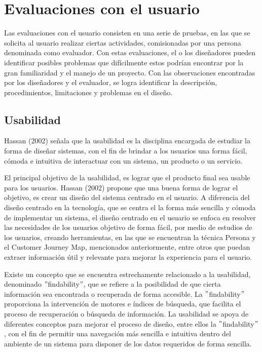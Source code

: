\section{Evaluaciones con el usuario}
\label{EvaluacionesCap3}

Las evaluaciones con el usuario consisten en una serie de pruebas, en las que se solicita al usuario realizar ciertas actividades, comisionadas por una persona denominada como evaluador. Con estas evaluaciones, el o los diseñadores pueden identificar posibles problemas que difícilmente estos podrían encontrar por la gran familiaridad y el manejo de un proyecto. Con las observaciones encontradas por los diseñadores y el evaluador, se logra identificar la descripción, procedimientos, limitaciones y problemas en el diseño.


\subsection{Usabilidad}
\label{UsabilidadCap3}

Hassan (2002) señala que la usabilidad es la disciplina encargada de estudiar la forma de diseñar sistemas, con el fin de brindar a los usuarios una forma fácil, cómoda e intuitiva de interactuar con un sistema, un producto o un servicio.

El principal objetivo de la usabilidad, es lograr que el producto final sea usable para los usuarios. Hassan (2002) propone que una buena forma de lograr el objetivo, es crear un diseño del sistema centrado en el usuario. A diferencia del diseño centrado en la tecnología, que se centra el la forma más sencilla y cómoda de implementar un sistema, el diseño centrado en el usuario se enfoca en resolver las necesidades de los usuarios objetivo de forma fácil, por medio de estudios de los usuarios, creando herramientas, en las que se encuentran la técnica Persona y el Customer Journey Map, mencionados anteriormente, entre otros que puedan extraer información útil y relevante para mejorar la experiencia para el usuario.

Existe un concepto que se encuentra estrechamente relacionado a la usabilidad, denominado $"$findability$"$, que se refiere a la posibilidad de que cierta información sea encontrada o recuperada de forma accesible. La $"$findability$"$ proporciona la intervención de motores e índices de búsqueda, que facilita el proceso de recuperación o búsqueda de información. La usabilidad se apoya de diferentes conceptos para mejorar el proceso de diseño, entre ellos la $"$findability$"$, con el fin de permitir una navegación más sencilla e intuitiva dentro del ambiente de un sistema para disponer de los datos requeridos de forma sencilla.

